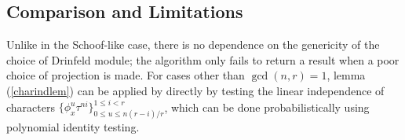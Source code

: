 \subsection{Comparison and Limitations}

Unlike in the Schoof-like case, there is no dependence on the genericity of the choice of Drinfeld module; the algorithm only fails to return a result when a poor choice of projection is made. For cases other than $\gcd(n,r) = 1$, lemma (\ref{charindlem}) can be applied by directly by testing the linear independence of characters $\{ \phi_x^{u}\tau^{ni} \}_{0 \leq u \leq n(r-i)/r }^{1 \leq i < r}$, which can be done probabilistically using polynomial identity testing. 

